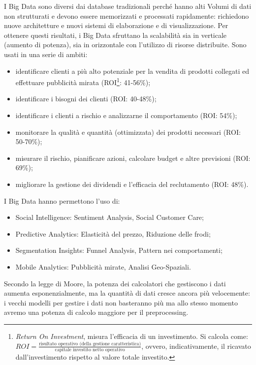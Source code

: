 \documentclass[a4page, 11pt]{article}
\begin{document}
I Big Data sono diversi dai database tradizionali perché hanno alti Volumi di dati non strutturati e devono essere memorizzati e processati rapidamente: richiedono nuove architetture e nuovi sistemi di elaborazione e di visualizzazione.
Per ottenere questi risultati, i Big Data sfruttano la scalabilità sia in verticale (aumento di potenza), sia in orizzontale con l'utilizzo di risorse distribuite. Sono usati in una serie di ambiti:
\begin{itemize}
  \item identificare clienti a più alto potenziale per la vendita di prodotti collegati ed effettuare pubblicità mirata (ROI\footnote{\textit{Return On Investment}, misura l'efficacia di un investimento. Si calcola come: $ROI = \frac{\text{risultato operativo (della gestione caratteristica)}}{\text{capitale investito netto operativo}}$, ovvero, indicativamente, il ricavato dall'investimento rispetto al valore totale investito.}: 41-56\%);
  \item identificare i bisogni dei clienti (ROI: 40-48\%);
  \item identificare i clienti a rischio e analizzarne il comportamento (ROI: 54\%);
  \item monitorare la qualità e quantità (ottimizzata) dei prodotti necessari (ROI: 50-70\%);
  \item misurare il rischio, pianificare azioni, calcolare budget e altre previsioni (ROI: 69\%);
  \item migliorare la gestione dei dividendi  e l'efficacia del reclutamento (ROI: 48\%).
\end{itemize}

I Big Data hanno permettono l'uso di:
\begin{itemize}
  \item Social Intelligence: Sentiment Analysis, Social Customer Care;
  \item Predictive Analytics: Elasticità del prezzo, Riduzione delle frodi;
  \item Segmentation Insights: Funnel Analysis, Pattern nei comportamenti;
  \item Mobile Analytics: Pubblicità mirate, Analisi Geo-Spaziali.
\end{itemize}

Secondo la legge di Moore, la potenza dei calcolatori che gestiscono i dati aumenta esponenzialmente, ma la quantità di dati cresce ancora più velocemente: i vecchi modelli per gestire i dati non basteranno più ma allo stesso momento avremo una potenza di calcolo maggiore per il preprocessing. \newline
\end{document}
